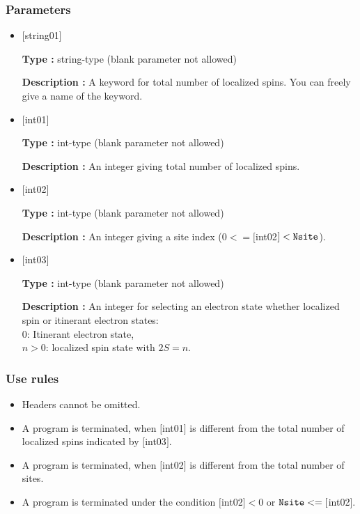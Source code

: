  \subsubsection{Parameters}
 \begin{itemize}

 \item  $[$string01$]$

 {\bf Type :} string-type (blank parameter not allowed)

{\bf Description :} A keyword for total number of localized spins. You can freely give a name of the keyword.


  \item  $[$int01$]$

 {\bf Type :} int-type (blank parameter not allowed)

{\bf Description :} An integer giving total number of localized spins.

 
  \item  $[$int02$]$

 {\bf Type :} int-type (blank parameter not allowed)

{\bf Description :} An integer giving a site index ($0<= [$int02$] <\verb|Nsite|$).

 
  \item  $[$int03$]$

 {\bf Type :} int-type (blank parameter not allowed)

{\bf Description :} An integer for selecting an electron state whether localized spin or itinerant electron states:\\
{
0: Itinerant electron state,\\
$n>$0: localized spin state with $2S=n$.
}\\
 \end{itemize}

\subsubsection{Use rules}
\begin{itemize}
\item Headers cannot be omitted. 
\item A program is terminated, when $[$int01$]$ is different from the total number of localized spins indicated by $[$int03$]$.
\item A program is terminated, when $[$int02$]$ is different from the total number of sites.
\item A program is terminated under the condition $[$int02$]<0$ or $\verb|Nsite|<=[$int02$]$.
\end{itemize}


